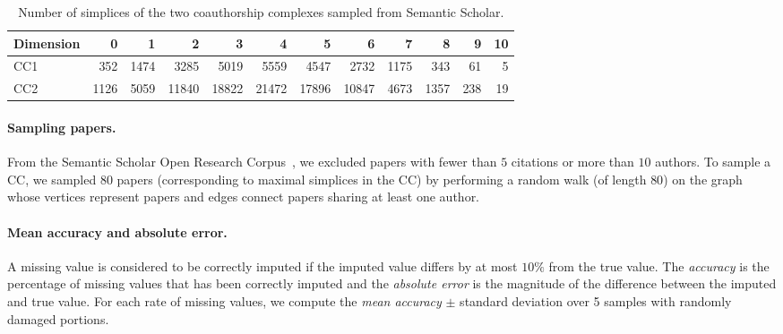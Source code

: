 \begin{table}[htbp]
  \centering
  \scriptsize{
  \begin{tabular}{lrrrrrrrrrrr}
    \toprule
    Dimension   & 0     & 1  & 2     & 3 & 4     & 5 & 6    & 7 & 8   & 9 & 10\\
    \midrule
    CC1 & 352  & 1474  & 3285  & 5019  & 5559  & 4547  & 2732  & 1175  & 343 & 61 & 5\\
    CC2 & 1126 & 5059 & 11840 & 18822 & 21472 & 17896  & 10847 & 4673 & 1357 & 238 & 19\\
    \bottomrule
  \end{tabular}}
  \vspace{2pt}
  \caption{%
  Number of simplices of the two coauthorship complexes sampled from Semantic Scholar.
  } \label{table:Simplices-coauthor}
\end{table}

\paragraph{Sampling papers.}
From the Semantic Scholar Open Research Corpus~\cite{ammar18NAACL}, we excluded papers with fewer than $5$ citations or more than $10$ authors.
To sample a CC, we sampled $80$ papers (corresponding to maximal simplices in the CC) by performing a random walk (of length $80$) on the graph whose vertices represent papers and edges connect papers sharing at least one author.

\paragraph{Mean accuracy and absolute error.}
A missing value is considered to be correctly imputed if the imputed value differs by at most $10\%$ from the true value.
The \emph{accuracy} is the percentage of missing values that has been correctly imputed and the \emph{absolute error} is the magnitude of the difference between the imputed and true value.
For each rate of missing values, we compute the \emph{mean accuracy} $\pm$ standard deviation over 5 samples with randomly damaged portions.
